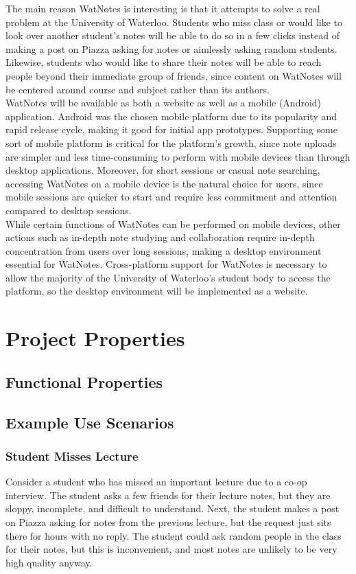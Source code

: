 \documentclass[12pt]{article}
\begin{document}
  The main reason WatNotes is interesting is that it attempts to solve a real problem at the University of Waterloo. Students who miss class or would like to look over another student's notes will be able to do so in a few clicks instead of making a post on Piazza asking for notes or aimlessly asking random students. Likewise, students who would like to share their notes will be able to reach people beyond their immediate group of friends, since content on WatNotes will be centered around course and subject rather than its authors. \\

WatNotes will be available as both a website as well as a mobile (Android) application. Android was the chosen mobile platform due to its popularity and rapid release cycle, making it good for initial app prototypes. Supporting some sort of mobile platform is critical for the platform's growth, since note uploads are simpler and less time-consuming to perform with mobile devices than through desktop applications. Moreover, for short sessions or casual note searching, accessing WatNotes on a mobile device is the natural choice for users, since mobile sessions are quicker to start and require less commitment and attention compared to desktop sessions. \\

While certain functions of WatNotes can be performed on mobile devices, other actions such as in-depth note studying and collaboration require in-depth concentration from users over long sessions, making a desktop environment essential for WatNotes. Cross-platform support for WatNotes is necessary to allow the majority of the University of Waterloo's student body to access the platform, so the desktop environment will be implemented as a website. \\
\newpage

\section{Project Properties}
\subsection{Functional Properties}
\subsection{Example Use Scenarios}
  \subsubsection{Student Misses Lecture}
  Consider a student who has missed an important lecture due to a co-op interview. The student asks a few friends for their lecture notes, but they are sloppy, incomplete, and difficult to understand. Next, the student makes a post on Piazza asking for notes from the previous lecture, but the request just sits there for hours with no reply. The student could ask random people in the class for their notes, but this  is inconvenient, and most notes are unlikely to be very high quality anyway. \\
\end{document}
